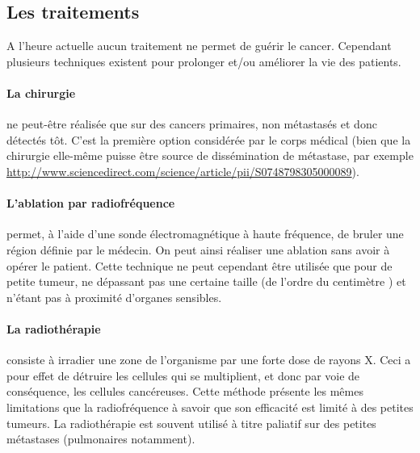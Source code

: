 \documentclass[main.tex]{subfiles}
\begin{document}
\subsection{Les traitements}
A l'heure actuelle aucun traitement ne permet de guérir le cancer. Cependant plusieurs techniques existent pour prolonger et/ou améliorer la vie des patients.
\paragraph{La chirurgie} ne peut-être réalisée que sur des cancers primaires, non métastasés et donc détectés tôt. C'est la première option considérée par le corps médical (bien que la chirurgie elle-même puisse être source de dissémination de métastase, \cf par exemple  \url{http://www.sciencedirect.com/science/article/pii/S0748798305000089}).

\paragraph{L'ablation par radiofréquence} permet, à l'aide d'une sonde électromagnétique à haute fréquence, de bruler une région définie par le médecin. On peut ainsi réaliser une ablation sans avoir à opérer le patient. Cette technique  
ne peut cependant être utilisée que pour de petite tumeur, ne dépassant pas une certaine taille (de l'ordre du centimètre ) et n'étant pas à proximité d'organes sensibles. 

\paragraph{La radiothérapie} consiste à irradier une zone de l'organisme par une forte dose de rayons X. Ceci a pour effet de détruire les cellules qui se multiplient, et donc par voie de conséquence, les cellules cancéreuses. Cette méthode présente les mêmes limitations que la radiofréquence à savoir que son efficacité est limité à des petites tumeurs. La radiothérapie est souvent utilisé à titre paliatif sur des petites métastases (pulmonaires notamment).
\end{document}
